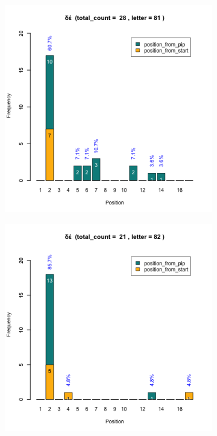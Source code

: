 \documentclass[a4paper]{article}
\begin{document}
\begin{figure}
\begin{subfigure}{0.45\textwidth}
\centering
\includegraphics[width=1\linewidth]{../../data/output/peter_R_par/plots/par2_lt81.png}
\end{subfigure}
\begin{subfigure}{0.45\textwidth}
\centering
\includegraphics[width=1\linewidth]{../../data/output/peter_R_par/plots/par2_lt82.png}
\end{subfigure}
\end{figure}
\end{document}
